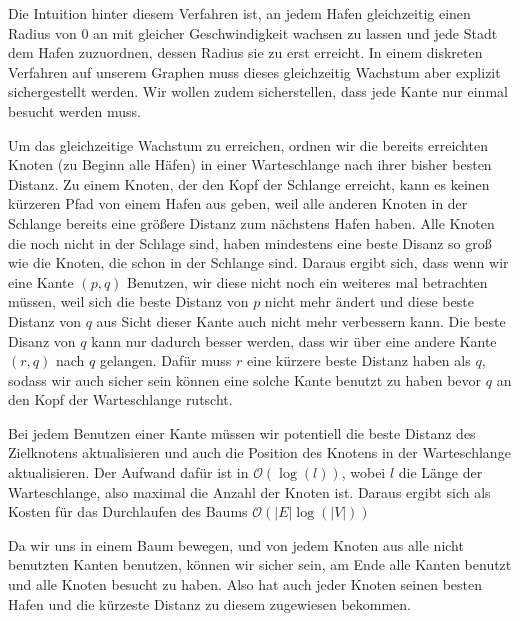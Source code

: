 \documentclass[parskip=half,a4paper]{scrartcl}
\begin{document}
Die Intuition hinter diesem Verfahren ist, an jedem Hafen gleichzeitig einen Radius von 0 an mit gleicher Geschwindigkeit wachsen zu lassen und jede Stadt dem Hafen zuzuordnen, dessen Radius sie zu erst erreicht. In einem diskreten Verfahren auf unserem Graphen muss dieses gleichzeitig Wachstum aber explizit sichergestellt werden. Wir wollen zudem sicherstellen, dass jede Kante nur einmal besucht werden muss.

Um das gleichzeitige Wachstum zu erreichen, ordnen wir die bereits erreichten Knoten (zu Beginn alle Häfen) in einer Warteschlange nach ihrer bisher besten Distanz. Zu einem Knoten, der den Kopf der Schlange erreicht, kann es keinen kürzeren Pfad von einem Hafen aus geben, weil alle anderen Knoten in der Schlange bereits eine größere Distanz zum nächstens Hafen haben. Alle Knoten die noch nicht in der Schlage sind, haben mindestens eine beste Disanz so groß wie die Knoten, die schon in der Schlange sind. Daraus ergibt sich, dass wenn wir eine Kante $(p,q)$ Benutzen, wir diese nicht noch ein weiteres mal betrachten müssen, weil sich die beste Distanz von $p$ nicht mehr ändert und diese beste Distanz von $q$ aus Sicht dieser Kante auch nicht mehr verbessern kann. Die beste Disanz von $q$ kann nur dadurch besser werden, dass wir über eine andere Kante $(r,q)$ nach $q$ gelangen. Dafür muss $r$ eine kürzere beste Distanz haben als $q$, sodass wir auch sicher sein können eine solche Kante benutzt zu haben bevor $q$ an den Kopf der Warteschlange rutscht.

Bei jedem Benutzen einer Kante müssen wir potentiell die beste Distanz des Zielknotens aktualisieren und auch die Position des Knotens in der Warteschlange aktualisieren. Der Aufwand dafür ist in \(\mathcal{O}(\log(l))\), wobei $l$ die Länge der Warteschlange, also maximal die Anzahl der Knoten ist. Daraus ergibt sich als Kosten für das Durchlaufen des Baums \(\mathcal{O}(|E|\log(|V|))\)

Da wir uns in einem Baum bewegen, und von jedem Knoten aus alle nicht benutzten Kanten benutzen, können wir sicher sein, am Ende alle Kanten benutzt und alle Knoten besucht zu haben. Also hat auch jeder Knoten seinen besten Hafen und die kürzeste Distanz zu diesem zugewiesen bekommen.
\end{document}
